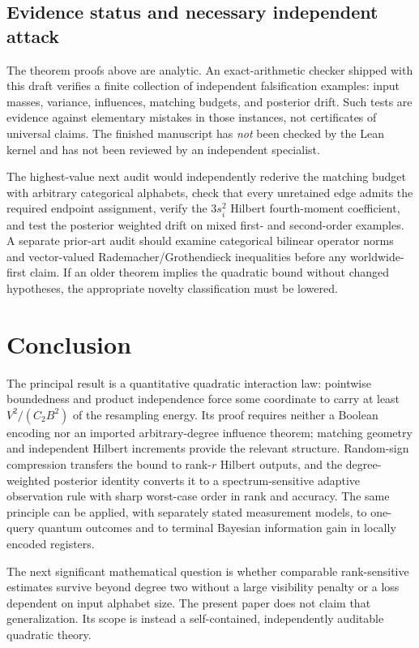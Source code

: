 \documentclass[11pt,letterpaper]{article}
\theoremstyle{definition}
\begin{document}
\subsection{Evidence status and necessary independent attack}
The theorem proofs above are analytic. An exact-arithmetic checker
shipped with this draft verifies a finite collection of independent
falsification examples: input masses, variance, influences,
matching budgets, and posterior drift. Such tests are evidence
against elementary mistakes in those instances, not certificates
of universal claims. The finished manuscript has \emph{not}
been checked by the Lean kernel and has not been reviewed by an
independent specialist.

The highest-value next audit would independently rederive the
matching budget with arbitrary categorical alphabets, check that
every unretained edge admits the required endpoint assignment,
verify the $3s_i^2$ Hilbert fourth-moment coefficient, and test the
posterior weighted drift on mixed first- and second-order examples.
A separate prior-art audit should examine categorical bilinear
operator norms and vector-valued Rademacher/Grothendieck inequalities
before any worldwide-first claim. If an older theorem implies the
quadratic bound without changed hypotheses, the appropriate novelty
classification must be lowered.

\section{Conclusion}\label{sec:conclusion}
The principal result is a quantitative quadratic interaction law:
pointwise boundedness and product independence force some coordinate
to carry at least $V^2/(C_2B^2)$ of the resampling energy. Its proof
requires neither a Boolean encoding nor an imported arbitrary-degree
influence theorem; matching geometry and independent Hilbert increments
provide the relevant structure. Random-sign compression transfers the
bound to rank-$r$ Hilbert outputs, and the degree-weighted posterior
identity converts it to a spectrum-sensitive adaptive observation
rule with sharp worst-case order in rank and accuracy. The same
principle can be applied, with separately stated measurement models,
to one-query quantum outcomes and to terminal Bayesian information
gain in locally encoded registers.

The next significant mathematical question is whether comparable
rank-sensitive estimates survive beyond degree two without a
large visibility penalty or a loss dependent on input alphabet size.
The present paper does not claim that generalization. Its scope is
instead a self-contained, independently auditable quadratic theory.
\end{document}
